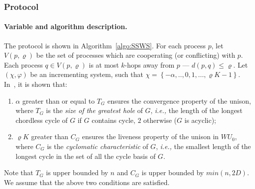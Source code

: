 \documentclass[11pt]{article}
\newcommand{\ie}{\emph{i.e., }}
\begin{document}
\subsubsection{Protocol }


\paragraph{Variable and algorithm description.} 
The protocol is shown in Algorithm~\ref{algo:SSWS}.
For each process $p$, let $V(p,\varrho)$ be the set of processes which are cooperating (or conflicting) with $p$.  
Each process $q \in V(p,\varrho)$ is at most $k$-hops away from $p$ --- $d(p,q) \leq \varrho$.
Let $(\chi,\varphi)$ be an incrementing system, such that $\chi = \left\{ -\alpha ,..,0,1,...,\varrho K-1\right\}$.
In~\cite{BPV04b}, it is shown that:
\begin{enumerate}
\item $\alpha$  greater than or equal to $T_G$  ensures the convergence property of the unison, 
where $T_G$ is the \emph{size of the greatest hole} of $G$, \ie the length of the longest chordless cycle of $G$ if $G$ contains
cycle, $2$ otherwise ($G$ is acyclic);
\item $\varrho K$  greater than $C_G$  ensures the liveness property of the unison in $WU_0$, 
where $C_G$ is the \emph{cyclomatic characteristic} of $G$, \ie the smallest length of the longest 
cycle in the set of all the cycle basis of $G$. 
\end{enumerate}
Note that $T_G$ is upper bounded by $n$ and $C_G$ is upper bounded by $min(n,2D)$.
We assume that the above two conditions are satisfied.  
\end{document}
